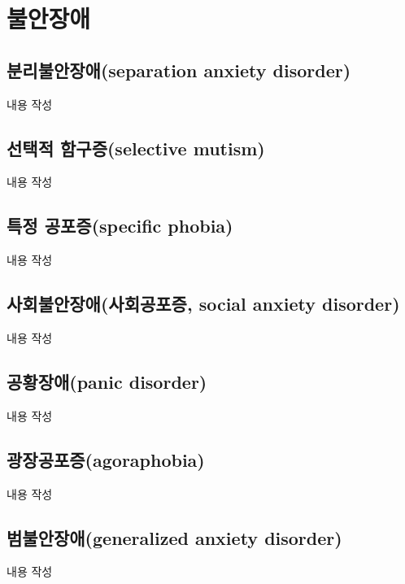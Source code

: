 \section{불안장애}

\subsection{분리불안장애(separation anxiety disorder)}
내용 작성

\subsection{선택적 함구증(selective mutism)}
내용 작성

\subsection{특정 공포증(specific phobia)}
내용 작성

\subsection{사회불안장애(사회공포증, social anxiety disorder)}
내용 작성

\subsection{공황장애(panic disorder)}
내용 작성

\subsection{광장공포증(agoraphobia)}
내용 작성

\subsection{범불안장애(generalized anxiety disorder)}
내용 작성
